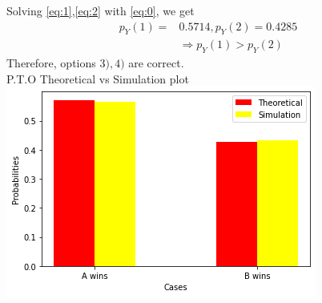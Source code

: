 \documentclass[journal,12pt,twocolumn]{IEEEtran}
\begin{document}
Solving \eqref{eq:1},\eqref{eq:2} with \eqref{eq:0}, we get
\begin{align}
\tag{104.11}
    p_{Y}(1)=&0.5714, p_{Y}(2)=0.4285\\
\tag{104.12}
    &\Rightarrow p_{Y}(1)>p_{Y}(2)
\end{align}
Therefore, options $3),4)$ are correct.\\
P.T.O
\newpage
Theoretical vs Simulation plot
\centering
\includegraphics[scale=0.65]{Assignment8.png}
\end{document}
